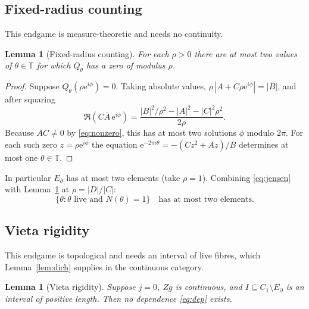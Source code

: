 \documentclass[11pt]{amsart}
\newtheorem{lemma}[theorem]{Lemma}
\theoremstyle{remark}
\newcommand{\T}{\mathbb T}
\newcommand{\e}{\mathrm e}
\begin{document}
\subsection{Fixed-radius counting}
This endgame is measure-theoretic and needs no continuity.

\begin{lemma}[Fixed-radius counting]\label{lem:fixedradius}
For each $\rho>0$ there are at most two values of $\theta\in\T$ for which $Q_\theta$ has a zero
of modulus $\rho$.
\end{lemma}

\begin{proof}
Suppose $Q_\theta(\rho\e^{i\phi})=0$. Taking absolute values,
$\rho\,|A+C\rho\e^{i\phi}|=|B|$, and after squaring
\[
\Re\!\left(C\overline A\,\e^{i\phi}\right)
=\frac{|B|^2/\rho^2-|A|^2-|C|^2\rho^2}{2\rho} .
\]
Because $AC\neq0$ by \eqref{eq:nonzero}, this has at most two solutions $\phi$ modulo $2\pi$.
For each such zero $z=\rho\e^{i\phi}$ the equation $\e^{-2\pi i\theta}=-(Cz^2+Az)/B$ determines
at most one $\theta\in\T$.
\end{proof}

In particular $E_\partial$ has at most two elements (take $\rho=1$). Combining
\eqref{eq:jensen} with Lemma~\ref{lem:fixedradius} at $\rho=|D|/|C|$:
\begin{equation}\label{eq:N1finite}
\{\theta:\theta\text{ live and }N(\theta)=1\}\quad\text{has at most two elements.}
\end{equation}

\subsection{Vieta rigidity}
This endgame is topological and needs an interval of live fibres, which
Lemma~\ref{lem:dich} supplies in the continuous category.

\begin{lemma}[Vieta rigidity]\label{lem:vieta}
Suppose $j=0$, $Zg$ is continuous, and $I\subseteq C_1\setminus E_\partial$ is an interval of
positive length. Then no dependence \eqref{eq:dep} exists.
\end{lemma}
\end{document}
